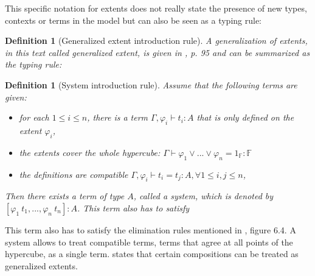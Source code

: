 \documentclass[12pt,a4paper,twoside,xetex]{book} %
\newcommand{\keyword}[1]{\emph{#1}\index{#1}}
\newtheorem{definition}[theorem]{Definition}
\begin{document}
This specific notation for extents does not really state the presence of new 
types, contexts or terms in the model but can also be seen as a typing rule: 

\begin{prooftree}

\end{prooftree}

\begin{definition}[Generalized extent introduction rule]\label{genextent}
A generalization of extents, in this text called \keyword{generalized extent}, is given in \cite{Huber2016}, p. 95 and can be summarized as the typing rule:

\begin{prooftree}
\end{prooftree}

\end{definition}

\begin{definition}[System introduction rule]
Assume that the following terms are given: 
\begin{itemize}
\item for each $1 \leq i \leq n$, there is a term  $\Gamma, \varphi_i \vdash 
t_i : A$ that is only defined on the extent $\varphi_i$, 
\item the extents cover the whole hypercube: $\Gamma \vdash \varphi_1 \vee ... 
\vee \varphi_n = 1_{\mathbb{F}} : \mathbb{F}$ 
\item the definitions are compatible $\Gamma, \varphi_i \vdash t_i = t_j : A, 
\forall 1\leq i,j\leq n$, 
\end{itemize}
Then there exists a term of type $A$, called a \keyword{system}, which  is denoted 
by $[\varphi_1 \  t_1, ..., \varphi_n \ t_n]: A$. This term also has to satisfy
\end{definition}

This term also has to satisfy the elimination rules mentioned in \cite{Huber2016}, figure 6.4.  A system allows to treat compatible terms, terms that agree at all points of the hypercube, as a single term.  states that certain compositions can be treated as generalized extents.
\end{document}
